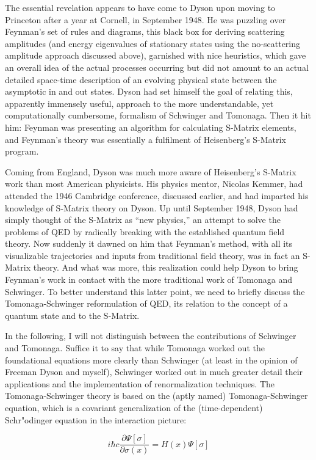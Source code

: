 \documentclass[12pt]{article}
\begin{document}
The essential revelation appears to have come to Dyson upon moving to Princeton after a year at Cornell, in September 1948. He was puzzling over Feynman's set of rules and diagrams, this black box for deriving scattering amplitudes (and energy eigenvalues of stationary states using the no-scattering amplitude approach discussed above), garnished with nice heuristics, which gave an overall idea of the actual processes occurring but did not amount to an actual detailed space-time description of an evolving physical state between the asymptotic in and out states. Dyson had set himself the goal of relating this, apparently immensely useful, approach to the more understandable, yet computationally cumbersome, formalism of Schwinger and Tomonaga. Then it hit him: Feynman was presenting an algorithm for calculating S-Matrix elements, and Feynman's theory was essentially a fulfilment of Heisenberg's S-Matrix program.

Coming from England, Dyson was much more aware of Heisenberg's S-Matrix work than most American physicists. His physics mentor, Nicolas Kemmer, had attended the 1946 Cambridge conference, discussed earlier, and had imparted his knowledge of S-Matrix theory on Dyson. Up until September 1948, Dyson had simply thought of the S-Matrix as ``new physics,'' an attempt to solve the problems of QED by radically breaking with the established quantum field theory. Now suddenly it dawned on him that Feynman's method, with all its visualizable trajectories and inputs from traditional field theory, was in fact an S-Matrix theory. And what was more, this realization could help Dyson to bring Feynman's work in contact with the more traditional work of Tomonaga and Schwinger. To better understand this latter point, we need to briefly discuss the Tomonaga-Schwinger reformulation of QED, its relation to the concept of a quantum state and to the S-Matrix.

In the following, I will not distinguish between the contributions of Schwinger and Tomonaga. Suffice it to say that while Tomonaga worked out the foundational equations more clearly than Schwinger (at least in the opinion of Freeman Dyson and myself), Schwinger worked out in much greater detail their applications and the implementation of renormalization techniques. The Tomonaga-Schwinger theory is based on the (aptly named) Tomonaga-Schwinger equation, which is a covariant generalization of the (time-dependent) Schr"odinger equation in the interaction picture:

\begin{equation}
i \hbar c \frac{\partial \Psi [\sigma]}{\partial \sigma (x)} = H (x) \Psi [\sigma]
\end{equation}
\end{document}
